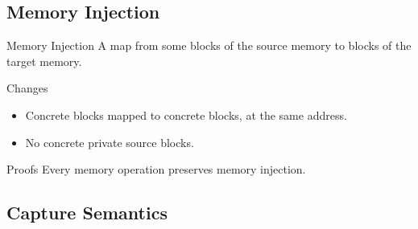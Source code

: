 \subsection{Memory Injection}
\begin{frame}{\subsecname}

  \begin{block}{Memory Injection}
    A map from some blocks of the source memory to blocks of the target memory.
  \end{block}
  \vfill
  \begin{block}{Changes}
    \begin{itemize}
    \item Concrete blocks mapped to concrete blocks, at the same address.
    \item No concrete private source blocks.
    \end{itemize}
  \end{block}
  \vfill
  \begin{exampleblock}{Proofs}
    Every memory operation preserves memory injection.
  \end{exampleblock}
  
\end{frame}

\subsection{Capture Semantics}
\begin{frame}{\subsecname}

  \\

\end{frame}

